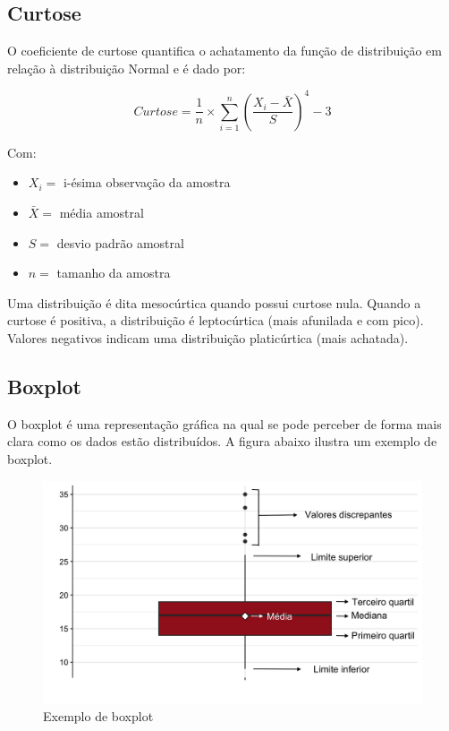 \documentclass[
]{estat/estat}
\begin{document}
\hypertarget{curtose}{%
\subsection{Curtose}\label{curtose}}

O coeficiente de curtose quantifica o achatamento da função de
distribuição em relação à distribuição Normal e é dado por:

\[Curtose = \frac{1}{n}\times\sum\limits_{i=1}^{n}\left(\frac{ X_i-\bar{X} }{S} \right)^4 - 3\]

Com:

\begin{itemize}
\item
  \(X_i =\) i-ésima observação da amostra
\item
  \(\bar{X} =\) média amostral
\item
  \(S =\) desvio padrão amostral
\item
  \(n =\) tamanho da amostra
\end{itemize}

Uma distribuição é dita mesocúrtica quando possui curtose nula. Quando a
curtose é positiva, a distribuição é leptocúrtica (mais afunilada e com
pico). Valores negativos indicam uma distribuição platicúrtica (mais
achatada).

\hypertarget{boxplot}{%
\subsection{Boxplot}\label{boxplot}}

O boxplot é uma representação gráfica na qual se pode perceber de forma
mais clara como os dados estão distribuídos. A figura abaixo ilustra um
exemplo de boxplot.

\begin{figure}

{\centering \includegraphics{images/box_uni.png}

}

\caption{Exemplo de boxplot}

\end{figure}
\end{document}

